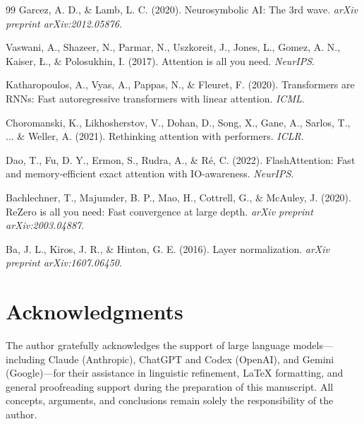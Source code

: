 \documentclass[11pt,a4paper]{article}
\begin{document}
\begin{thebibliography}{99}
Garcez, A. D., \& Lamb, L. C. (2020).
Neurosymbolic AI: The 3rd wave.
\textit{arXiv preprint arXiv:2012.05876}.

Vaswani, A., Shazeer, N., Parmar, N., Uszkoreit, J., Jones, L., Gomez, A. N., Kaiser, {\L}., \& Polosukhin, I. (2017).
Attention is all you need.
\textit{NeurIPS}.

Katharopoulos, A., Vyas, A., Pappas, N., \& Fleuret, F. (2020).
Transformers are RNNs: Fast autoregressive transformers with linear attention.
\textit{ICML}.

Choromanski, K., Likhosherstov, V., Dohan, D., Song, X., Gane, A., Sarlos, T., ... \& Weller, A. (2021).
Rethinking attention with performers.
\textit{ICLR}.

Dao, T., Fu, D. Y., Ermon, S., Rudra, A., \& Ré, C. (2022).
FlashAttention: Fast and memory-efficient exact attention with IO-awareness.
\textit{NeurIPS}.

Bachlechner, T., Majumder, B. P., Mao, H., Cottrell, G., \& McAuley, J. (2020).
ReZero is all you need: Fast convergence at large depth.
\textit{arXiv preprint arXiv:2003.04887}.

Ba, J. L., Kiros, J. R., \& Hinton, G. E. (2016).
Layer normalization.
\textit{arXiv preprint arXiv:1607.06450}.
\end{thebibliography}

\section*{Acknowledgments}
The author gratefully acknowledges the support of large language models---including Claude (Anthropic), ChatGPT and Codex (OpenAI), and Gemini (Google)---for their assistance in linguistic refinement, LaTeX formatting, and general proofreading support during the preparation of this manuscript.
All concepts, arguments, and conclusions remain solely the responsibility of the author.
\end{document}
